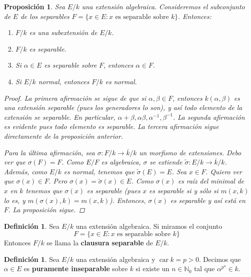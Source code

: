 \documentclass[12pt]{book}
\newtheorem{prop}[teo]{Proposición}
\theoremstyle{definition}
\newtheorem{defn}[teo]{Definición}
\newcommand{\NN}{\mathbb{N}}
\DeclareMathOperator{\car}{car}
\begin{document}
\begin{prop}
Sea $E/k$ una extensión algebraica. Consideremos el subconjunto de $E$ de los separables $F=\{x\in E : x\text{ es separable sobre }k\}$. Entonces:
\begin{enumerate}
\item $F/k$ es una subextensión de $E/k$.
\item $F/k$ es separable.
\item Si $\alpha\in E$ es separable sobre $F$, entonces $\alpha\in F$.
\item Si $E/k$ normal, entonces $F/k$ es normal.	
\end{enumerate}
\begin{proof}
La primera afirmación se sigue de que si $\alpha,\beta\in F$, entonces $k(\alpha,\beta)$ es una extensión separable (pues los generadores lo son), y así todo elemento de la extensión se separable. En particular, $\alpha+\beta, \alpha\beta, \alpha^{-1},\beta^{-1}$. La segunda afirmación es evidente pues todo elemento es separable. La tercera afirmación sigue directamente de la proposición anterior. 

Para la última afirmación, sea $\sigma:F/k\to \overline{k}/k$ un morfismo de extensiones. Debo ver que $\sigma(F)=F$. Como $E/F$ es algebraica, $\sigma$ se extiende $\tilde{\sigma}:E/k\to \overline{k}/k$. Además, como $E/k$ es normal, tenemos que $\tilde{\sigma}(E)=E$. Sea $x\in F$. Quiero ver que $\sigma(x)\in F$. Pero $\sigma(x)=\tilde{\sigma}(x)\in E$. Como $\sigma(x)$ es raíz del minimal de $x$ en $k$ tenemos que $\sigma(x)$ es separable (pues $x$ es separable si y sólo si $m(x,k)$ lo es, y $m(\sigma(x),k)=m(x,k)$). Entonces, $\sigma(x)$ es separable y así está en $F$. La proposición sigue.
\end{proof}
\end{prop}

\begin{defn}
Sea $E/k$ una extensión algebraica. Si miramos el conjunto $$F=\{x\in E : x\text{ es separable sobre }k\}$$ Entonces $F/k$ se llama la \textbf{clausura separable} de $E/k$.
\end{defn}

\begin{defn}
Sea $E/k$ una extensión algebraica y $\car k= p > 0$. Decimos que $\alpha\in E$ es \textbf{puramente inseparable} sobre $k$ si existe un $n\in\NN_0$ tal que $\alpha^{p^n}\in k$.
\end{defn}
\end{document}
